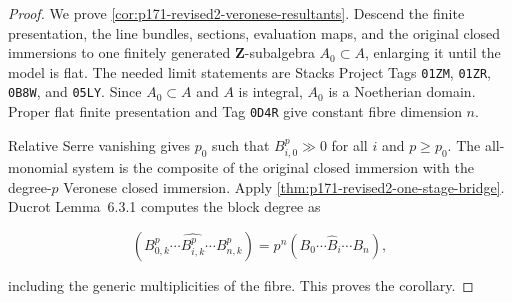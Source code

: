 \begin{proof}
We prove \cref{cor:p171-revised2-veronese-resultants}.  Descend the
finite presentation, the line bundles, sections, evaluation maps, and the
original closed immersions to one finitely generated
\(\mathbf Z\)-subalgebra \(A_0\subset A\), enlarging it until the model is
flat.  The needed limit statements are Stacks Project Tags \texttt{01ZM},
\texttt{01ZR}, \texttt{0B8W}, and \texttt{05LY}.  Since \(A_0\subset A\)
and \(A\) is integral, \(A_0\) is a Noetherian domain.  Proper flat finite
presentation and Tag \texttt{0D4R} give constant fibre dimension \(n\).

Relative Serre vanishing gives \(p_0\) such that \(B_{i,0}^p\gg0\) for all
\(i\) and \(p\geq p_0\).  The all-monomial system is the composite of the
original closed immersion with the degree-\(p\) Veronese closed immersion.
Apply \cref{thm:p171-revised2-one-stage-bridge}.  Ducrot
Lemma~6.3.1 computes the block degree as

\[
 (B_{0,k}^p\cdots\widehat{B_{i,k}^p}\cdots B_{n,k}^p)
 =p^n(B_0\cdots\widehat B_i\cdots B_n),
\]

including the generic multiplicities of the fibre.  This proves the
corollary.
\end{proof}

